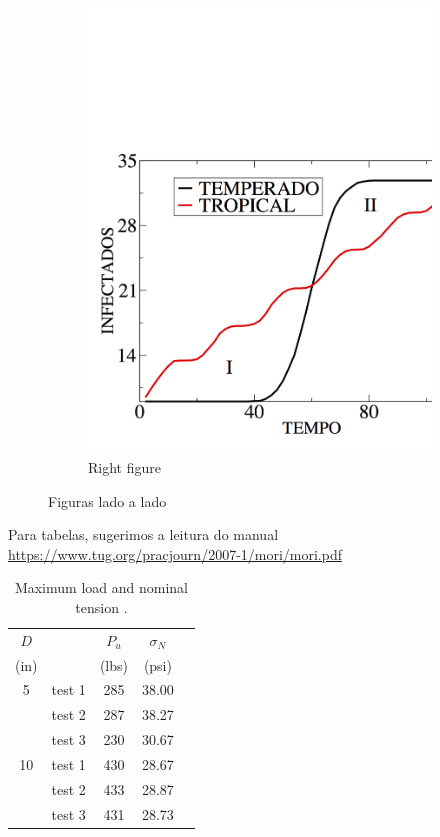\documentclass[10pt,twoside,a4paper]{article}
\begin{document}
\begin{figure}[!ht]
\begin{subfigure}{0.49\textwidth}
\includegraphics[scale=0.2]{cnmac3}
\caption{Right figure}
\label{fig:right}
\end{subfigure}
\caption{Figuras lado a lado}
\label{fig:combined}
\end{figure}

\lipsum[5]

\begin{center}
Para tabelas, sugerimos a leitura do manual \url{https://www.tug.org/pracjourn/2007-1/mori/mori.pdf}
\end{center}

\begin{table}[h!]
\label{tabela1}
\caption{Maximum  load  and  nominal  tension .}
\centering
\begin{tabular}{clccc}
\toprule
$D$ &               & $P_u$      & $\sigma_N$    \\
(in)&               & (lbs)      & (psi)          \\  \toprule
%
5    & test 1      & 285         & 38.00   \\
& test 2      & 287         & 38.27          \\
& test 3      & 230         & 30.67          \\   \midrule
10   & test 1      & 430         & 28.67   \\
& test 2      & 433         & 28.87          \\
& test 3      & 431         & 28.73          \\    \bottomrule
\end{tabular}
\end{table}
\end{document}
